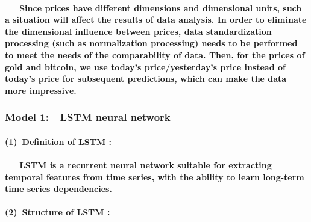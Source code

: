 \documentclass{mcmthesis}
\begin{document}
	\paragraph{\ \ \ Since prices have different dimensions and dimensional units, such a situation will affect the results of data analysis. In order to eliminate the dimensional influence between prices, data standardization processing (such as normalization processing) needs to be performed to meet the needs of the comparability of data. Then, for the prices of gold and bitcoin, we use today's price/yesterday's price instead of today's price for subsequent predictions, which can make the data more impressive. }
	
	\subsubsection{Model 1:\ \ LSTM neural network}
	\paragraph{(1)\ Definition of LSTM : }\cite{LSTM}\cite{LSTMLH}
	
	\paragraph{	\ \ \ LSTM is a recurrent neural network suitable for extracting temporal features from time series, with the ability to learn long-term time series dependencies. }
	
	\paragraph{(2)\ Structure of LSTM :}
	
	
\end{document}
